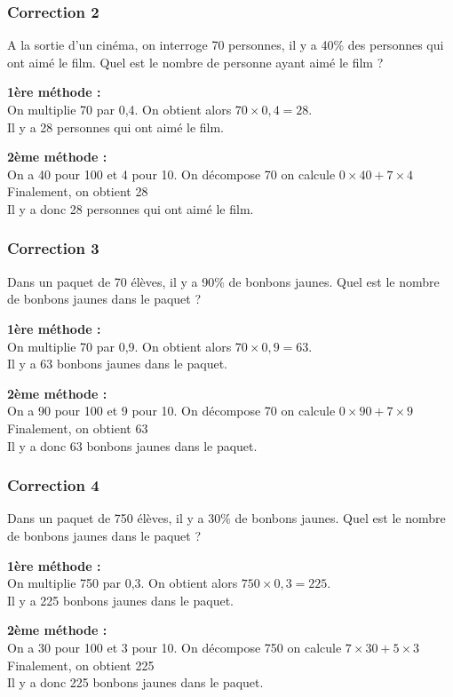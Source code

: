 \documentclass[15pt, mathserif]{beamer}
\begin{document}
\begin{frame}
\vspace{-10mm}
	\frametitle{Correction 2}
A la sortie d'un cinéma, on interroge 70 personnes, il y a 40\% des personnes qui ont aimé le film. Quel est le nombre de personne ayant aimé le film ? \begin{multicols}{2} \textbf{1ère méthode : \\} On multiplie 70 par 0,4. On obtient alors $70 \times 0,4=28$. \\ Il y a 28 personnes qui ont aimé le film. 
 \columnbreak 
 
 \textbf{2ème méthode :} \\ On a 40 pour 100 et 4 pour 10. On décompose 70 on calcule $0\times40+7\times4$ \\ Finalement, on obtient 28\\ Il y a donc 28 personnes qui ont aimé le film. \end{multicols}\end{frame}


\begin{frame}
\vspace{-10mm}
	\frametitle{Correction 3}
Dans un paquet de 70 élèves, il y a 90\% de bonbons jaunes. Quel est le nombre de bonbons jaunes dans le paquet ? \begin{multicols}{2} \textbf{1ère méthode : \\} On multiplie 70 par 0,9. On obtient alors $70 \times 0,9=63$. \\ Il y a 63 bonbons jaunes dans le paquet. 
 \columnbreak 
 
 \textbf{2ème méthode :} \\ On a 90 pour 100 et 9 pour 10. On décompose 70 on calcule $0\times90+7\times9$ \\ Finalement, on obtient 63\\ Il y a donc 63 bonbons jaunes dans le paquet. \end{multicols}\end{frame}


\begin{frame}
\vspace{-10mm}
	\frametitle{Correction 4}
Dans un paquet de 750 élèves, il y a 30\% de bonbons jaunes. Quel est le nombre de bonbons jaunes dans le paquet ? \begin{multicols}{2} \textbf{1ère méthode : \\} On multiplie 750 par 0,3. On obtient alors $750 \times 0,3=225$. \\ Il y a 225 bonbons jaunes dans le paquet. 
 \columnbreak 
 
 \textbf{2ème méthode :} \\ On a 30 pour 100 et 3 pour 10. On décompose 750 on calcule $7\times30+5\times3$ \\ Finalement, on obtient 225\\ Il y a donc 225 bonbons jaunes dans le paquet. \end{multicols}\end{frame}
\end{document}
